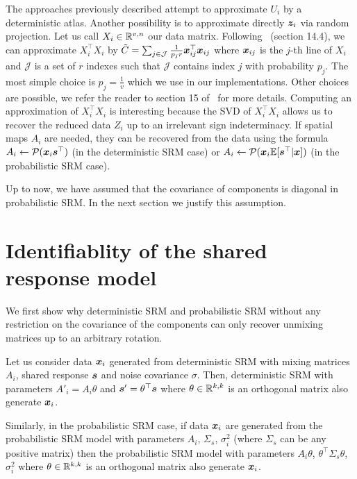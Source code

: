 The approaches previously described attempt to approximate $U_i$ by a
deterministic atlas. Another possibility is to approximate directly $\boldsymbol{z}_i$ via
random projection.
Let us call $X_i \in \mathbb{R}^{v,
  n}$ our data matrix. Following~\cite{mahoney2016lecture} (section 14.4), we
can approximate $X_i^{\top} X_i$ by $\tilde{C} = \sum_{j \in \mathcal{J}} \frac1{p_j r} \boldsymbol{x}_{ij}^{\top} \boldsymbol{x}_{ij}$ where $\boldsymbol{x}_{ij}$ is the $j$-th line of
  $X_i$ and $\mathcal{J}$ is a set of $r$ indexes such that $\mathcal{J}$ contains
  index $j$ with probability $p_j$. The most simple choice is $p_j=\frac1{v}$
  which we use in our implementations. Other choices are possible, we refer the reader to section 15
  of~\cite{mahoney2016lecture} for more details.  Computing an approximation of $X_i^{\top} X_i$ is interesting
  because the SVD of $X_i^{\top} X_i$ allows us to recover the reduced data
  $Z_i$ up to an irrelevant sign indeterminacy. 
  If spatial maps $A_i$ are needed, they can be recovered from the data using the formula
  $A_i \leftarrow \mathcal{P}(\boldsymbol{x}_i \boldsymbol{s}^{\top})$ (in the deterministic SRM case) or
  $A_i \leftarrow \mathcal{P}(\boldsymbol{x}_i \mathbb{E}[\boldsymbol{s}^{\top}|\boldsymbol{x}])$ (in the probabilistic SRM case).

  Up to now, we have assumed that the covariance of components is diagonal in
  probabilistic SRM. In the next section we justify this assumption.

\section{Identifiablity of the shared response model}
We first show why deterministic SRM and probabilistic SRM without any
restriction on the covariance of the components can
only recover unmixing matrices up to an arbitrary rotation.

Let us consider data $\boldsymbol{x}_i$ generated from deterministic SRM with
mixing matrices $A_i$, shared response $\boldsymbol{s}$ and noise covariance $\sigma$.
Then, deterministic SRM with parameters $A'_i = A_i \theta$ and $\boldsymbol{s}' = \theta^{\top} \boldsymbol{s}$ where
$\theta \in \mathbb{R}^{k, k}$ is an orthogonal matrix also
generate $\boldsymbol{x}_i$.

Similarly, in the probabilistic SRM case, if data $\boldsymbol{x}_i$ are generated from the
probabilistic SRM model with 
parameters $A_i$, $\Sigma_s$, $\sigma_i^2$ (where $\Sigma_s$ can be any positive
matrix) then the probabilistic SRM model with parameters $A_i\theta$, $\theta^{\top} \Sigma_s \theta$, $\sigma_i^2$  where
$\theta \in \mathbb{R}^{k, k}$ is an orthogonal matrix also generate $\boldsymbol{x}_i$.

